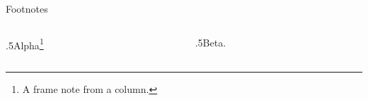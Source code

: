 \documentclass[aspectratio=169]{beamer}
\begin{document}
\begin{frame}{Footnotes}
\begin{columns}[T,onlytextwidth]
\begin{column}{.5\textwidth}Alpha\footnote[frame]{A frame note from a column.}\end{column}
\begin{column}{.5\textwidth}Beta.\end{column}
\end{columns}
\end{frame}
\end{document}
